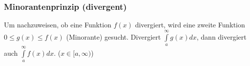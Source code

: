\subsubsection{Minorantenprinzip (divergent)}
  Um nachzuweisen, ob eine Funktion $f(x)$ divergiert, wird eine zweite
  Funktion $0 \leq g(x) \leq f(x)$ (Minorante) gesucht. Divergiert
  $\int\limits_a^{\infty} g(x) dx$,
  dann divergiert auch $\int\limits_a^{\infty} f(x) dx$. ($x \in [a, \infty)$)
  